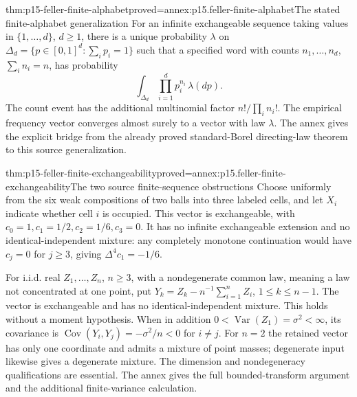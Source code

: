 \begin{hbtheorem}{thm:p15-feller-finite-alphabet}{proved=annex:p15.feller-finite-alphabet}{The stated finite-alphabet generalization}
For an infinite exchangeable sequence taking values in
\(\{1,\ldots,d\}\), \(d\geq1\), there is a unique probability \(\lambda\)
on
\(\Delta_d=\{p\in[0,1]^d:\sum_i p_i=1\}\) such that a specified word
with counts \(n_1,\ldots,n_d\), \(\sum_i n_i=n\), has probability
\[
                              \int_{\Delta_d}\prod_{i=1}^dp_i^{n_i}\,
                                                       \lambda(dp).
\]
The count event has the additional multinomial factor
\(n!/\prod_i n_i!\). The empirical frequency vector converges almost
surely to a vector with law \(\lambda\).
The annex gives the explicit bridge from the already proved
standard-Borel directing-law theorem to this source generalization.
\end{hbtheorem}

\begin{hbtheorem}{thm:p15-feller-finite-exchangeability}{proved=annex:p15.feller-finite-exchangeability}{The two source finite-sequence obstructions}
Choose uniformly from the six weak compositions of two balls into
three labeled cells, and let \(X_i\) indicate whether cell \(i\) is
occupied. This vector is exchangeable, with
\(c_0=1,c_1=1/2,c_2=1/6,c_3=0\).
It has no infinite exchangeable extension and no identical-independent
mixture: any completely monotone continuation would have \(c_j=0\)
for \(j\geq3\), giving \(\Delta^4c_1=-1/6\).

For i.i.d. real \(Z_1,\ldots,Z_n\), \(n\geq3\), with a
nondegenerate common law, meaning a law not concentrated at one point, put
\(Y_k=Z_k-n^{-1}\sum_{i=1}^nZ_i\), \(1\leq k\leq n-1\).
The vector is exchangeable and has no identical-independent mixture.
This holds without a moment hypothesis. When in addition
\(0<\operatorname{Var}(Z_1)=\sigma^2<\infty\), its covariance
is \(\operatorname{Cov}(Y_i,Y_j)=-\sigma^2/n<0\) for \(i\ne j\).
For \(n=2\) the retained vector has only one coordinate and admits
a mixture of point masses; degenerate input likewise gives a degenerate
mixture. The dimension and nondegeneracy qualifications are essential.
The annex gives the full bounded-transform argument and the
additional finite-variance calculation.
\end{hbtheorem}

